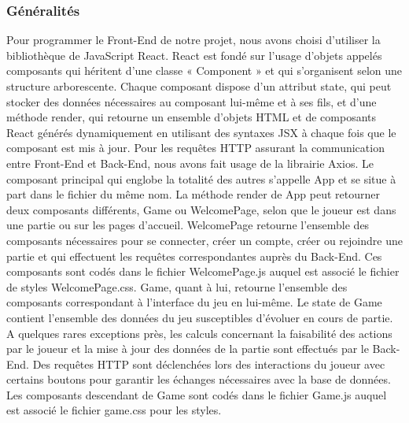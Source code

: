 \documentclass[12pt,twoside,a4paper]{article}
\begin{document}
\subsubsection{Généralités}
Pour programmer le Front-End de notre projet, nous avons choisi d’utiliser la bibliothèque de JavaScript React. React est fondé sur l’usage d’objets appelés composants qui héritent d’une classe « Component » et qui s’organisent selon une structure arborescente. Chaque composant dispose d’un attribut state, qui peut stocker des données nécessaires au composant lui-même et à ses fils, et d’une méthode render, qui retourne un ensemble d’objets HTML et de composants React générés dynamiquement en utilisant des syntaxes JSX à chaque fois que le composant est mis à jour.
Pour les requêtes HTTP assurant la communication entre Front-End et Back-End, nous avons fait usage de la librairie Axios.
Le composant principal qui englobe la totalité des autres s’appelle App et se situe à part dans le fichier du même nom. La méthode render de App peut retourner deux composants différents, Game ou WelcomePage, selon que le joueur est dans une partie ou sur les pages d’accueil.
WelcomePage retourne l’ensemble des composants nécessaires pour se connecter, créer un compte, créer ou rejoindre une partie et qui effectuent les requêtes correspondantes auprès du Back-End. Ces composants sont codés dans le fichier WelcomePage.js auquel est associé le fichier de styles WelcomePage.css.
Game, quant à lui, retourne l’ensemble des composants correspondant à l’interface du jeu en lui-même. Le state de Game contient l’ensemble des données du jeu susceptibles d’évoluer en cours de partie. A quelques rares exceptions près, les calculs concernant la faisabilité des actions par le joueur et la mise à jour des données de la partie sont effectués par le Back-End. Des requêtes HTTP sont déclenchées lors des interactions du joueur avec certains boutons pour garantir les échanges nécessaires avec la base de données. Les composants descendant de Game sont codés dans le fichier Game.js auquel est associé le fichier game.css pour les styles.
\end{document}
